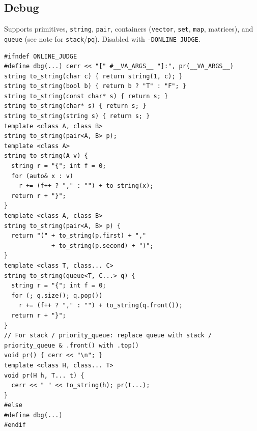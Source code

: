 \subsection{Debug}
Supports primitives, \texttt{string}, \texttt{pair}, containers (\texttt{vector}, \texttt{set}, \texttt{map}, matrices), and \texttt{queue} (see note for \texttt{stack}/\texttt{pq}). Disabled with \texttt{-DONLINE\_JUDGE}.
\begin{verbatim}
#ifndef ONLINE_JUDGE
#define dbg(...) cerr << "[" #__VA_ARGS__ "]:", pr(__VA_ARGS__)
string to_string(char c) { return string(1, c); }
string to_string(bool b) { return b ? "T" : "F"; }
string to_string(const char* s) { return s; }
string to_string(char* s) { return s; }
string to_string(string s) { return s; }
template <class A, class B>
string to_string(pair<A, B> p);
template <class A>
string to_string(A v) {
  string r = "{"; int f = 0;
  for (auto& x : v)
    r += (f++ ? "," : "") + to_string(x);
  return r + "}";
}
template <class A, class B>
string to_string(pair<A, B> p) {
  return "(" + to_string(p.first) + ","
             + to_string(p.second) + ")";
}
template <class T, class... C>
string to_string(queue<T, C...> q) {
  string r = "{"; int f = 0;
  for (; q.size(); q.pop())
    r += (f++ ? "," : "") + to_string(q.front());
  return r + "}";
}
// For stack / priority_queue: replace queue with stack / priority_queue & .front() with .top()
void pr() { cerr << "\n"; }
template <class H, class... T>
void pr(H h, T... t) {
  cerr << " " << to_string(h); pr(t...);
}
#else
#define dbg(...)
#endif
\end{verbatim}
